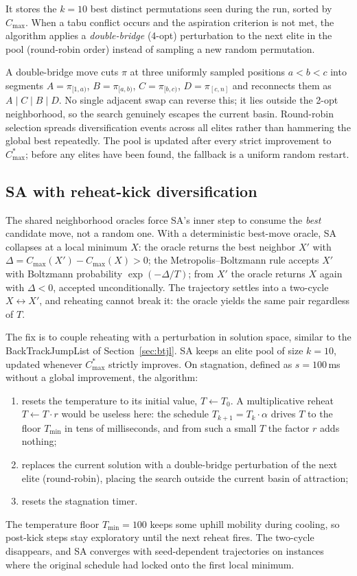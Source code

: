 \documentclass[preprint,12pt,authoryear]{elsarticle}
\begin{document}
It stores the $k = 10$ best distinct permutations seen during the run,
sorted by $C_{\max}$.
When a tabu conflict occurs and the aspiration criterion is not met,
the algorithm applies a \emph{double-bridge} (4-opt) perturbation to
the next elite in the pool (round-robin order) instead of sampling
a new random permutation.

A double-bridge move cuts $\pi$ at three uniformly sampled positions
$a < b < c$ into segments
$A = \pi_{[1,a)}$, $B = \pi_{[a,b)}$, $C = \pi_{[b,c)}$, $D = \pi_{[c,n]}$
and reconnects them as $A \mid C \mid B \mid D$.
No single adjacent swap can reverse this; it lies outside the 2-opt
neighborhood, so the search genuinely escapes the current basin.
Round-robin selection spreads diversification events across all elites
rather than hammering the global best repeatedly.
The pool is updated after every strict improvement to $C_{\max}^*$;
before any elites have been found, the fallback is a uniform random restart.

\subsection{SA with reheat-kick diversification}
\label{sec:sa-kick}

The shared neighborhood oracles force SA's inner step to consume
the \emph{best} candidate move, not a random one. With a
deterministic best-move oracle, SA collapses at a local minimum
$X$: the oracle returns the best neighbor $X'$ with $\Delta =
C_{\max}(X') - C_{\max}(X) > 0$; the Metropolis--Boltzmann rule accepts $X'$ with
Boltzmann probability $\exp(-\Delta/T)$; from $X'$ the oracle returns $X$
again with $\Delta < 0$, accepted unconditionally. The trajectory
settles into a two-cycle $X \leftrightarrow X'$, and reheating
cannot break it: the oracle yields the same pair regardless of $T$.

The fix is to couple reheating with a perturbation in solution
space, similar to the BackTrackJumpList of Section~\ref{sec:btjl}.
SA keeps an elite pool of size $k = 10$, updated whenever
$C_{\max}^*$ strictly improves. On stagnation, defined as $s =
100$\,ms without a global improvement, the algorithm:
\begin{enumerate}
  \item resets the temperature to its initial value, $T \leftarrow
        T_0$. A multiplicative reheat $T \leftarrow T \cdot r$ would
        be useless here: the schedule $T_{k+1} = T_k \cdot \alpha$
        drives $T$ to the floor $T_{\min}$ in tens of milliseconds,
        and from such a small $T$ the factor $r$ adds nothing;
  \item replaces the current solution with a double-bridge
        perturbation of the next elite (round-robin), placing the
        search outside the current basin of attraction;
  \item resets the stagnation timer.
\end{enumerate}
The temperature floor $T_{\min} = 100$ keeps some uphill mobility
during cooling, so post-kick steps stay exploratory until the next
reheat fires. The two-cycle disappears, and SA converges with
seed-dependent trajectories on instances where the original
schedule had locked onto the first local minimum.
\end{document}
